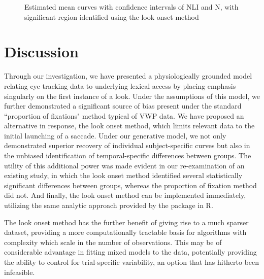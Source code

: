 \begin{figure}[H]
    \centering
    \caption{Estimated mean curves with confidence intervals of NLI and N, with significant region identified using the look onset method}
\label{fig:irldata2}
\end{figure}



\section{Discussion}



Through our investigation, we have presented a physiologically grounded model relating eye tracking data to underlying lexical access by placing emphasis singularly on the first instance of a look. Under the assumptions of this model, we further demonstrated a significant source of bias present under the standard ``proportion of fixations" method typical of VWP data. We have proposed an alternative in response, the look onset method, which limits relevant data to the initial launching of a saccade. Under our generative model, we not only demonstrated superior recovery of individual subject-specific curves but also in the unbiased identification of temporal-specific differences between groups. The utility of this additional power was made evident in our re-examination of an existing study, in which the look onset method identified several statistically significant differences between groups, whereas the proportion of fixation method did not. And finally, the look onset method can be implemented immediately, utilizing the same analytic approach provided by the  package in R.

The look onset method has the further benefit of giving rise to a much sparser dataset, providing a more computationally tractable basis for algorithms with complexity which scale in the number of observations. This may be of considerable advantage in fitting mixed models to the data, potentially providing the ability to control for trial-specific variability, an option that has hitherto been infeasible. 

